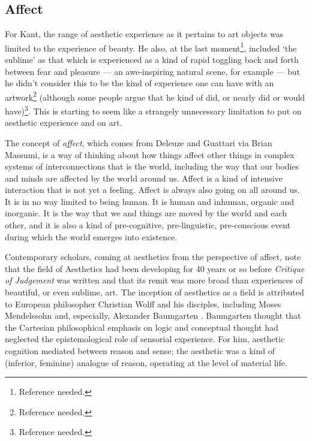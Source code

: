 \documentclass[letterpaper]{article}
\begin{document}
    \subsection{Affect}

        For Kant, the range of aesthetic experience as it pertains to art objects was limited to the experience of beauty.  He also, at the last moment\footnote{Reference needed.}, included ‘the sublime’ as that which is experienced as a kind of rapid toggling back and forth between fear and pleasure — an awe-inspiring natural scene, for example — but he didn't consider this to be the kind of experience one can have with an artwork\footnote{Reference needed.} (although some people argue that he kind of did, or nearly did or would have)\footnote{Reference needed.}. This is starting to seem like a strangely unnecessary limitation to put on aesthetic experience and on art. 
        
        The concept of \emph{affect}, which comes from Deleuze and Guattari via Brian Massumi, is a way of thinking about how things affect other things in complex systems of interconnections that is the world, including the way that our bodies and minds are affected by the world around us. Affect is a kind of intensive interaction that is not yet a feeling. Affect is always also going on all around us. It is in no way limited to being human. It is human and inhuman, organic and inorganic. It is the way that we and things are moved by the world and each other, and it is also a kind of pre-cognitive, pre-linguistic, pre-conscious event during which the world emerges into existence. 
        
        Contemporary scholars, coming at aesthetics from the perspective of affect, note that the field of Aesthetics had been developing for 40 years or so before \emph{Critique of Judgement} was written and that its remit was more broad than experiences of beautiful, or even sublime, art. The inception of aesthetics as a field is attributed to European philosopher Christian Wolff and his disciples, including Moses Mendelssohn and, especially, Alexander Baumgarten \citep[pp.327-338]{EagletonFrPrtclrs1990}. Baumgarten thought that the Cartesian philosophical emphasis on logic and conceptual thought had neglected the epistemological role of sensorial experience. For him, aesthetic cognition mediated between reason and sense; the aesthetic was a kind of (inferior, feminine) analogue of reason, operating at the level of material life. 
        
\end{document}
